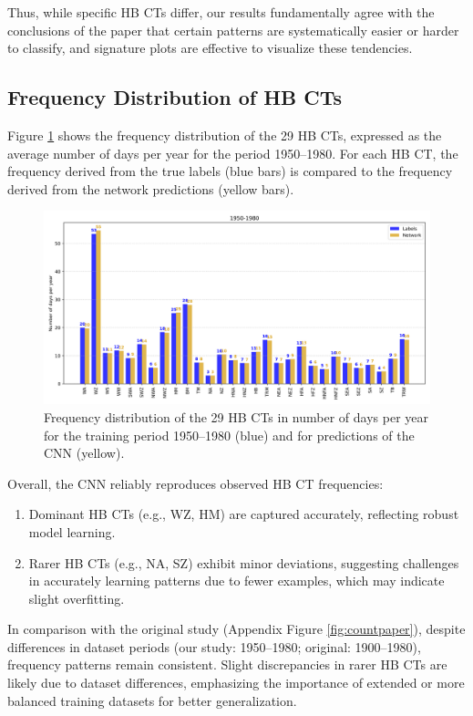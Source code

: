 \documentclass[
]{krantz}
\providecommand{\tightlist}{%
  \setlength{\itemsep}{0pt}\setlength{\parskip}{0pt}}
\begin{document}
Thus, while specific HB CTs differ, our results fundamentally agree with the conclusions of the paper that certain patterns are systematically easier or harder to classify, and signature plots are effective to visualize these tendencies.

\subsection{Frequency Distribution of HB CTs}\label{frequency-distribution-of-hb-cts}

Figure \ref{fig:count} shows the frequency distribution of the 29 HB CTs, expressed as the average number of days per year for the period 1950--1980.
For each HB CT, the frequency derived from the true labels (blue bars) is compared to the frequency derived from the network predictions (yellow bars).

\begin{figure}

{\centering \includegraphics[width=0.7\linewidth]{work/01-weatherpattern/figures/daycount} 

}

\caption{Frequency distribution of the 29 HB CTs in number of days per year for the training period 1950–1980 (blue) and for predictions of the CNN (yellow).}\label{fig:count}
\end{figure}

Overall, the CNN reliably reproduces observed HB CT frequencies:

\begin{enumerate}
\def\labelenumi{\arabic{enumi}.}
\tightlist
\item
  Dominant HB CTs (e.g., WZ, HM) are captured accurately, reflecting robust model learning.
\item
  Rarer HB CTs (e.g., NA, SZ) exhibit minor deviations, suggesting challenges in accurately learning patterns due to fewer examples, which may indicate slight overfitting.
\end{enumerate}

In comparison with the original study (Appendix Figure \ref{fig:countpaper}), despite differences in dataset periods (our study: 1950--1980; original: 1900--1980), frequency patterns remain consistent. Slight discrepancies in rarer HB CTs are likely due to dataset differences, emphasizing the importance of extended or more balanced training datasets for better generalization.
\end{document}
